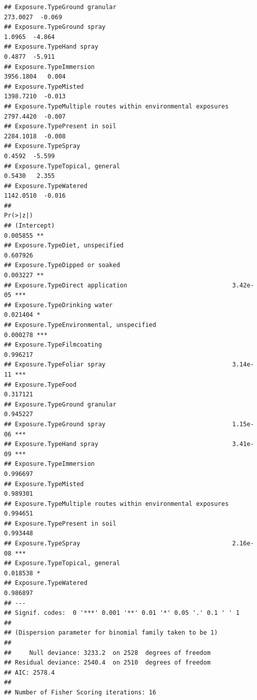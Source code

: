 \documentclass[
  12pt,
]{article}
\begin{document}
\begin{verbatim}
## Exposure.TypeGround granular                                  273.0027  -0.069
## Exposure.TypeGround spray                                       1.0965  -4.864
## Exposure.TypeHand spray                                         0.4877  -5.911
## Exposure.TypeImmersion                                       3956.1804   0.004
## Exposure.TypeMisted                                          1398.7210  -0.013
## Exposure.TypeMultiple routes within environmental exposures  2797.4420  -0.007
## Exposure.TypePresent in soil                                 2284.1018  -0.008
## Exposure.TypeSpray                                              0.4592  -5.599
## Exposure.TypeTopical, general                                   0.5430   2.355
## Exposure.TypeWatered                                         1142.0510  -0.016
##                                                             Pr(>|z|)    
## (Intercept)                                                 0.005855 ** 
## Exposure.TypeDiet, unspecified                              0.607926    
## Exposure.TypeDipped or soaked                               0.003227 ** 
## Exposure.TypeDirect application                             3.42e-05 ***
## Exposure.TypeDrinking water                                 0.021404 *  
## Exposure.TypeEnvironmental, unspecified                     0.000278 ***
## Exposure.TypeFilmcoating                                    0.996217    
## Exposure.TypeFoliar spray                                   3.14e-11 ***
## Exposure.TypeFood                                           0.317121    
## Exposure.TypeGround granular                                0.945227    
## Exposure.TypeGround spray                                   1.15e-06 ***
## Exposure.TypeHand spray                                     3.41e-09 ***
## Exposure.TypeImmersion                                      0.996697    
## Exposure.TypeMisted                                         0.989301    
## Exposure.TypeMultiple routes within environmental exposures 0.994651    
## Exposure.TypePresent in soil                                0.993448    
## Exposure.TypeSpray                                          2.16e-08 ***
## Exposure.TypeTopical, general                               0.018538 *  
## Exposure.TypeWatered                                        0.986897    
## ---
## Signif. codes:  0 '***' 0.001 '**' 0.01 '*' 0.05 '.' 0.1 ' ' 1
## 
## (Dispersion parameter for binomial family taken to be 1)
## 
##     Null deviance: 3233.2  on 2528  degrees of freedom
## Residual deviance: 2540.4  on 2510  degrees of freedom
## AIC: 2578.4
## 
## Number of Fisher Scoring iterations: 16
\end{verbatim}
\end{document}
